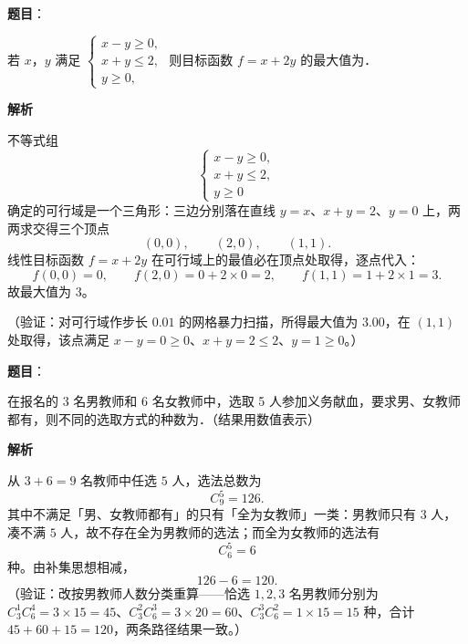 \begin{answer}

\textbf{题目}：

若 \(x\)，\(y\) 满足 $\begin{cases} x-y\geqslant 0,\\ x+y\leqslant 2,\\ y\geqslant 0, \end{cases}$ 则目标函数 \(f=x+2y\) 的最大值为\gkblank{}．

\textbf{解析}

不等式组
\nopagebreak[4]
\[
\begin{cases}
x-y\geqslant0,\\
x+y\leqslant2,\\
y\geqslant0
\end{cases}
\]
确定的可行域是一个三角形：三边分别落在直线 \(y=x\)、\(x+y=2\)、\(y=0\) 上，两两求交得三个顶点
\nopagebreak[4]
\[
(0,0),\qquad(2,0),\qquad(1,1).
\]
线性目标函数 \(f=x+2y\) 在可行域上的最值必在顶点处取得，逐点代入：
\nopagebreak[4]
\[
f(0,0)=0,\qquad f(2,0)=0+2\times0=2,\qquad f(1,1)=1+2\times1=3.
\]
故最大值为 \(3\)。

（验证：对可行域作步长 \(0.01\) 的网格暴力扫描，所得最大值为 \(3.00\)，在 \((1,1)\) 处取得，该点满足 \(x-y=0\geqslant0\)、\(x+y=2\leqslant2\)、\(y=1\geqslant0\)。）


\end{answer}
\begin{answer}

\textbf{题目}：

在报名的 3 名男教师和 6 名女教师中，选取 5 人参加义务献血，要求男、女教师都有，则不同的选取方式的种数为\gkblank{}．（结果用数值表示）

\textbf{解析}

从 \(3+6=9\) 名教师中任选 \(5\) 人，选法总数为
\nopagebreak[4]
\[
C_{9}^{5}=126.
\]
其中不满足「男、女教师都有」的只有「全为女教师」一类：男教师只有 \(3\) 人，凑不满 \(5\) 人，故不存在全为男教师的选法；而全为女教师的选法有
\nopagebreak[4]
\[
C_{6}^{5}=6
\]
种。由补集思想相减，
\nopagebreak[4]
\[
126-6=120.
\]
（验证：改按男教师人数分类重算——恰选 \(1,2,3\) 名男教师分别为 \(C_{3}^{1}C_{6}^{4}=3\times15=45\)、\(C_{3}^{2}C_{6}^{3}=3\times20=60\)、\(C_{3}^{3}C_{6}^{2}=1\times15=15\) 种，合计 \(45+60+15=120\)，两条路径结果一致。）


\end{answer}
